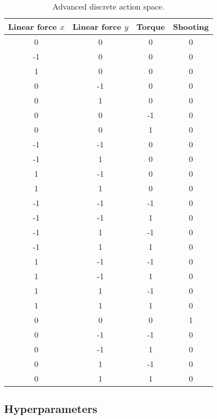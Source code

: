 \documentclass[11pt]{article}
\begin{document}
\begin{table}[H]
\centering
\caption{Advanced discrete action space.}
\begin{tabular}{cccc}
\toprule
\textbf{Linear force $x$} & \textbf{Linear force $y$} & \textbf{Torque} & \textbf{Shooting} \\
\midrule
0 & 0 & 0 & 0 \\
-1 & 0 & 0 & 0 \\
1 & 0 & 0 & 0 \\
0 & -1 & 0 & 0 \\
0 & 1 & 0 & 0 \\
0 & 0 & -1 & 0 \\
0 & 0 & 1 & 0 \\
-1 & -1 & 0 & 0 \\
-1 & 1 & 0 & 0 \\
1 & -1 & 0 & 0 \\
1 & 1 & 0 & 0 \\
-1 & -1 & -1 & 0 \\
-1 & -1 & 1 & 0 \\
-1 & 1 & -1 & 0 \\
-1 & 1 & 1 & 0 \\
1 & -1 & -1 & 0 \\
1 & -1 & 1 & 0 \\
1 & 1 & -1 & 0 \\
1 & 1 & 1 & 0 \\
0 & 0 & 0 & 1 \\
0 & -1 & -1 & 0 \\
0 & -1 & 1 & 0 \\
0 & 1 & -1 & 0 \\
0 & 1 & 1 & 0 \\
\bottomrule
\end{tabular}
\end{table}

\subsection{Hyperparameters}
\end{document}
